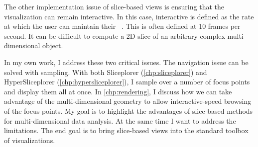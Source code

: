 The other implementation issue of slice-based views is ensuring that the
visualization can remain interactive. In this case, interactive is defined as
the rate at which the user can maintain their ~\cite{Shneiderman:1987}. This is often defined at 10 frames per second.
It can be difficult to compute a 2D slice of an arbitrary complex
multi-dimensional object. 

In my own work, I address these two critical issues. The navigation issue can
be solved with sampling. With both Sliceplorer (\autoref{chp:sliceplorer}) and
HyperSliceplorer (\autoref{chp:hypersliceplorer}), I sample over a number of
focus points and display them all at once. In \autoref{chp:rendering}, I
discuss how we can take advantage of the multi-dimensional geometry to allow
interactive-speed browsing of the focus points. My goal is to highlight the
advantages of slice-based methods for multi-dimensional data analysis. At the
same time I want to address the limitations. The end goal is to bring
slice-based views into the standard toolbox of visualizations.




